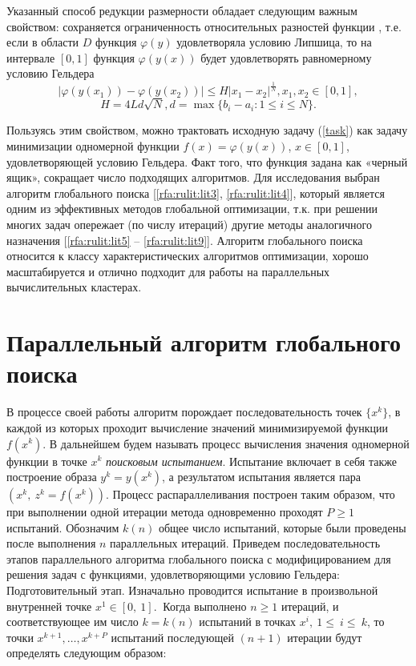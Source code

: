 \documentclass[10pt,a4paper]{book}
\begin{document}
Указанный способ редукции размерности обладает следующим важным свойством: сохраняется ограниченность относительных разностей функции , т.е. если в области $D$ функция $\varphi(y)$ удовлетворяла условию Липшица, то на интервале $[0,1]$ функция $\varphi(y(x))$ будет удовлетворять равномерному условию Гельдера
\begin{equation}
\label{holder}
\left|\varphi(y(x_1))-\varphi(y(x_2))\right|\leqslant H{\left|x_1-x_2\right|}^{\frac{1}{N}}, 
 x_1,x_2\in[0,1],
\end{equation}
\begin{equation}
H=4Ld\sqrt{N},d=\max\{b_i-a_i:1\leqslant i\leqslant N\}.
\end{equation}
 
 
Пользуясь этим свойством, можно трактовать исходную задачу (\ref{task}) как задачу минимизации одномерной функции $f\left(x\right)=\varphi\left(y\left(x\right)\right)$, $x\in[0,1]$, удовлетворяющей условию Гельдера. %
Факт того, что функция задана как «черный ящик», сокращает число подходящих алгоритмов. 
Для исследования выбран алгоритм глобального поиска [\ref{rfa:rulit:lit3}, \ref{rfa:rulit:lit4}], который является одним из эффективных методов глобальной оптимизации, т.к. при решении многих задач опережает (по числу итераций) другие методы аналогичного назначения [\ref{rfa:rulit:lit5} – \ref{rfa:rulit:lit9}]. Алгоритм глобального поиска относится к классу характеристических алгоритмов оптимизации, хорошо масштабируется и отлично подходит для работы на параллельных вычислительных кластерах. 

\section{Параллельный алгоритм глобального поиска}

В процессе своей работы алгоритм порождает последовательность точек $\{x^k\}$, в каждой из которых проходит вычисление значений минимизируемой функции $f(x^k)$. В дальнейшем будем называть процесс вычисления значения одномерной функции в точке $x^k$ \textit{поисковым испытанием}. Испытание включает в себя также построение образа $y^k=y(x^k)$, а результатом испытания является пара $(x^k,\ z^k=f(x^k))$. Процесс распараллеливания построен таким образом, что при выполнении одной итерации метода одновременно проходят $P\geq1$ испытаний. Обозначим $k(n)$ общее число испытаний, которые были проведены после выполнения $n$ параллельных итераций. 
Приведем последовательность этапов параллельного алгоритма глобального поиска с модифицированием для решения задач с функциями, удовлетворяющими условию Гельдера:
Подготовительный этап. Изначально проводится испытание в произвольной внутренней точке $x^1\in\left[0,\ 1\right].\ $ Когда выполнено $n\geq1$ итераций, и соответствующее им число $k=k(n)$ испытаний в точках $x^i,\ 1\le\ i\le\ k$, то точки $x^{k+1},\ldots,x^{k+P}$ испытаний последующей $(n+1)$ итерации будут определять следующим образом:
\end{document}
